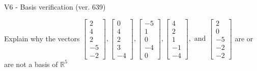 \begin{exercise}
  \begin{exerciseTitle}V6 - Basis verification (ver. 639)\end{exerciseTitle}
  \begin{exerciseStatement}
    Explain why the vectors \(\left[\begin{array}{r}
2 \\
4 \\
2 \\
-5 \\
-2
\end{array}\right] , \left[\begin{array}{r}
0 \\
4 \\
2 \\
3 \\
-4
\end{array}\right] , \left[\begin{array}{r}
-5 \\
1 \\
0 \\
-4 \\
0
\end{array}\right] , \left[\begin{array}{r}
4 \\
2 \\
1 \\
-1 \\
-4
\end{array}\right] , \text{ and } \left[\begin{array}{r}
2 \\
0 \\
-5 \\
-2 \\
-2
\end{array}\right]\) are or are not a basis of \(\mathbb{R}^5\)	



\end{exerciseStatement}
\end{exercise}
